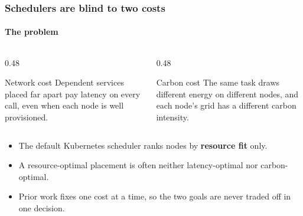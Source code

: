 \documentclass[aspectratio=169,11pt]{beamer}
\begin{document}
\begin{frame}[t]
\frametitle{Schedulers are blind to two costs}
\framesubtitle{The problem}
\begin{columns}[T]
\begin{column}{0.48\textwidth}
\begin{block}{Network cost}
Dependent services placed far apart pay latency on every call, even when each node is well provisioned.
\end{block}
\end{column}
\begin{column}{0.48\textwidth}
\begin{block}{Carbon cost}
The same task draws different energy on different nodes, and each node's grid has a different carbon intensity.
\end{block}
\end{column}
\end{columns}
\vspace{4pt}
\begin{itemize}
\item The default Kubernetes scheduler ranks nodes by \textbf{resource fit} only.
\item A resource-optimal placement is often neither latency-optimal nor carbon-optimal.
\item Prior work fixes one cost at a time, so the two goals are never traded off in one decision.
\end{itemize}
\vspace{2pt}
\begin{center}
\end{center}
\end{frame}
\end{document}

